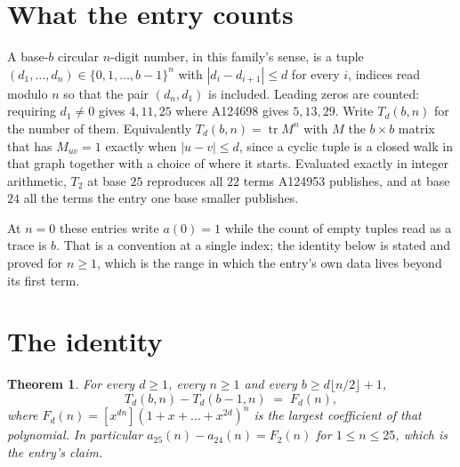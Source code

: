 \documentclass[11pt,a4paper]{article}
\theoremstyle{plain}
\newtheorem{theorem}{Theorem}
\theoremstyle{definition}
\begin{document}
\section{What the entry counts}

A base-$b$ circular $n$-digit number, in this family's sense, is a tuple
$(d_1,\dots,d_n)\in\{0,1,\dots,b-1\}^{n}$ with $|d_i-d_{i+1}|\le d$ for every $i$, indices
read modulo $n$ so that the pair $(d_n,d_1)$ is included. Leading zeros are counted: requiring
$d_1\ne0$ gives $4,11,25$ where A124698 gives $5,13,29$. Write $T_d(b,n)$ for the number of
them. Equivalently $T_d(b,n)=\operatorname{tr}M^{n}$ with $M$ the $b\times b$ matrix that has
$M_{uv}=1$ exactly when $|u-v|\le d$, since a cyclic tuple is a closed walk in that graph
together with a choice of where it starts. Evaluated exactly in integer arithmetic, $T_{2}$
at base $25$ reproduces all $22$ terms A124953 publishes, and at base $24$ all the
terms the entry one base smaller publishes.

At $n=0$ these entries write $a(0)=1$ while the count of empty tuples read as a trace is $b$.
That is a convention at a single index; the identity below is stated and proved for $n\ge1$,
which is the range in which the entry's own data lives beyond its first term.

\section{The identity}

\begin{theorem}
For every $d\ge1$, every $n\ge1$ and every $b\ge d\lfloor n/2\rfloor+1$,
\[
T_d(b,n)-T_d(b-1,n)\;=\;F_d(n),
\]
where $F_d(n)=[x^{dn}](1+x+\dots+x^{2d})^{n}$ is the largest coefficient of that
polynomial. In particular $a_{25}(n)-a_{24}(n)=F_{2}(n)$ for $1\le n\le25$, which
is the entry's claim.
\end{theorem}
\end{document}
